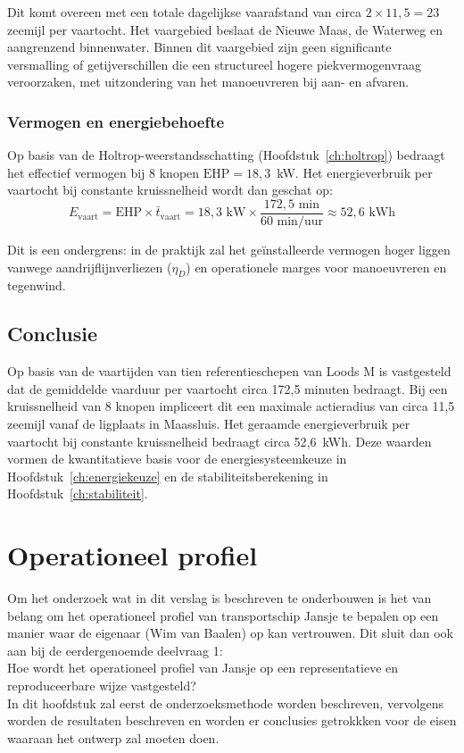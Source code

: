 Dit komt overeen met een totale dagelijkse vaarafstand van circa $2 \times 11{,}5 = 23$ 
zeemijl per vaartocht. Het vaargebied beslaat de Nieuwe Maas, de Waterweg en aangrenzend 
binnenwater. Binnen dit vaargebied zijn geen significante versmalling of getijverschillen 
die een structureel hogere piekvermogenvraag veroorzaken, met uitzondering van het 
manoeuvreren bij aan- en afvaren.

\subsection{Vermogen en energiebehoefte}
Op basis van de Holtrop-weerstandsschatting (Hoofdstuk~\ref{ch:holtrop}) bedraagt het 
effectief vermogen bij 8 knopen $\text{EHP} = 18{,}3$~kW. Het energieverbruik per vaartocht bij constante kruissnelheid 
wordt dan geschat op:
\begin{equation}
    E_\text{vaart} = \text{EHP} \times \bar{t}_\text{vaart} 
    = 18{,}3 \text{ kW} \times \frac{172{,}5 \text{ min}}{60 \text{ min/uur}} \approx 52{,}6 \text{ kWh}
    \label{eq:energieverbruik}
\end{equation}

Dit is een ondergrens: in de praktijk zal het geïnstalleerde vermogen hoger liggen 
vanwege aandrijflijnverliezen ($\eta_D$) en operationele marges voor manoeuvreren 
en tegenwind.

\section{Conclusie}
Op basis van de vaartijden van tien referentieschepen van Loods M is vastgesteld dat de 
gemiddelde vaarduur per vaartocht circa 172{,}5 minuten bedraagt. Bij een kruissnelheid van 
8 knopen impliceert dit een maximale actieradius van circa 11{,}5 zeemijl vanaf de 
ligplaats in Maassluis. Het geraamde energieverbruik per vaartocht bij constante 
kruissnelheid bedraagt circa 52{,}6~kWh. Deze waarden vormen de kwantitatieve basis 
voor de energiesysteemkeuze in Hoofdstuk~\ref{ch:energiekeuze} en de 
stabiliteitsberekening in Hoofdstuk~\ref{ch:stabiliteit}.


\chapter{Operationeel profiel}

\noindent Om het onderzoek wat in dit verslag is beschreven te onderbouwen is het van belang om het operationeel profiel van transportschip Jansje te bepalen op een manier waar de eigenaar (Wim van Baalen) op kan vertrouwen. Dit sluit dan ook aan bij de eerdergenoemde deelvraag 1: \\
Hoe wordt het operationeel profiel van Jansje op een representatieve en reproduceerbare wijze
vastgesteld? \\
In dit hoofdstuk zal eerst de onderzoeksmethode worden beschreven, vervolgens worden de resultaten beschreven en worden er conclusies getrokkken voor de eisen waaraan het ontwerp zal moeten doen. 

